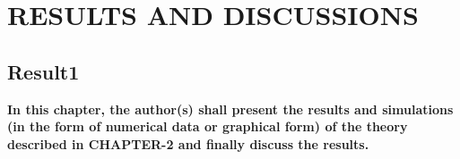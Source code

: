 
\chapter{RESULTS AND DISCUSSIONS}

\section{{\bf{Result1}}}
{\bf\color{red}In this chapter, the author(s) shall present the results and simulations (in the form of numerical data or graphical form) of the theory described in CHAPTER-2 and finally discuss the results.
}



